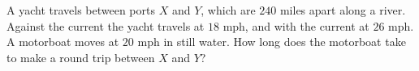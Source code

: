 A yacht travels between ports $X$ and $Y$, which are $240$ miles apart along a river. Against the current the yacht travels at $18$ mph, and with the current at $26$ mph. A motorboat moves at $20$ mph in still water. How long does the motorboat take to make a round trip between $X$ and $Y$?
